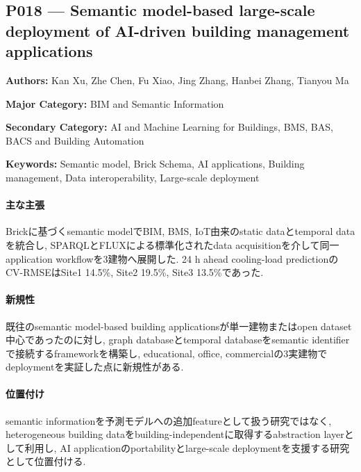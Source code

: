 \subsection{P018 --- Semantic model-based large-scale deployment of AI-driven building management applications}
\label{paper:P018}
\textbf{Authors:} Kan Xu, Zhe Chen, Fu Xiao, Jing Zhang, Hanbei Zhang, Tianyou Ma\par
\textbf{Major Category:} BIM and Semantic Information\par
\textbf{Secondary Category:} AI and Machine Learning for Buildings, BMS, BAS, BACS and Building Automation\par
\textbf{Keywords:} Semantic model, Brick Schema, AI applications, Building management, Data interoperability, Large-scale deployment\par
\paragraph{主な主張}
Brickに基づくsemantic modelでBIM, BMS, IoT由来のstatic dataとtemporal dataを統合し, SPARQLとFLUXによる標準化されたdata acquisitionを介して同一application workflowを3建物へ展開した. 24 h ahead cooling-load predictionのCV-RMSEはSite1 14.5\%, Site2 19.5\%, Site3 13.5\%であった. \cite{Xu:2024SemanticAI}
\paragraph{新規性}
既往のsemantic model-based building applicationsが単一建物またはopen dataset中心であったのに対し, graph databaseとtemporal databaseをsemantic identifierで接続するframeworkを構築し, educational, office, commercialの3実建物でdeploymentを実証した点に新規性がある.
\paragraph{位置付け}
semantic informationを予測モデルへの追加featureとして扱う研究ではなく, heterogeneous building dataをbuilding-independentに取得するabstraction layerとして利用し, AI applicationのportabilityとlarge-scale deploymentを支援する研究として位置付ける.
